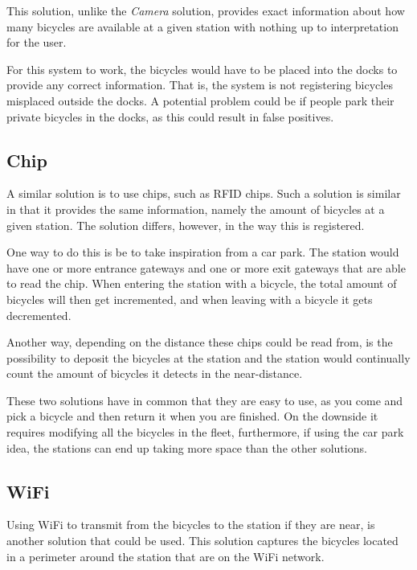 This solution, unlike the \textit{Camera} solution, provides exact information about how many bicycles are available at a given station with nothing up to interpretation for the user.

For this system to work, the bicycles would have to be placed into the docks to provide any correct information.
That is, the system is not registering bicycles misplaced outside the docks.
A potential problem could be if people park their private bicycles in the docks, as this could result in false positives.

\subsection{Chip}
A similar solution is to use chips, such as RFID chips. 
Such a solution is similar in that it provides the same information, namely the amount of bicycles at a given station.
The solution differs, however, in the way this is registered.

One way to do this is be to take inspiration from a car park.
The station would have one or more entrance gateways and one or more exit gateways that are able to read the chip.
When entering the station with a bicycle, the total amount of bicycles will then get incremented, and when leaving with a bicycle it gets decremented.

Another way, depending on the distance these chips could be read from, is the possibility to deposit the bicycles at the station and the station would continually count the amount of bicycles it detects in the near-distance.

These two solutions have in common that they are easy to use, as you come and pick a bicycle and then return it when you are finished.
On the downside it requires modifying all the bicycles in the fleet, furthermore, if using the car park idea, the stations can end up taking more space than the other solutions. 

\subsection{WiFi}
Using WiFi to transmit from the bicycles to the station if they are near, is another solution that could be used.
This solution captures the bicycles located in a perimeter around the station that are on the WiFi network.

